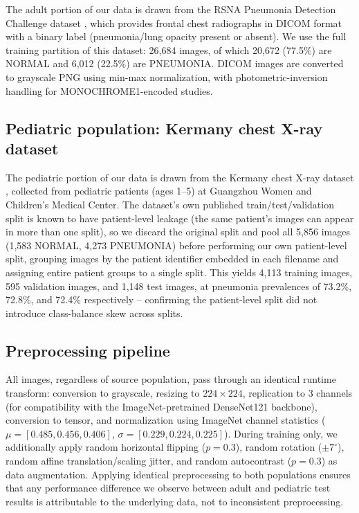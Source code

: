 \documentclass[conference]{IEEEtran}
\begin{document}
The adult portion of our data is drawn from the RSNA Pneumonia Detection
Challenge dataset \cite{rsna2019}, which provides frontal chest radiographs
in DICOM format with a binary label (pneumonia/lung opacity present or
absent). We use the full training partition of this dataset: 26{,}684
images, of which 20{,}672 (77.5\%) are NORMAL and 6{,}012 (22.5\%) are
PNEUMONIA. DICOM images are converted to grayscale PNG using min-max
normalization, with photometric-inversion handling for MONOCHROME1-encoded
studies.

\subsection{Pediatric population: Kermany chest X-ray dataset}

The pediatric portion of our data is drawn from the Kermany chest X-ray
dataset \cite{kermany2018cell}, collected from pediatric patients (ages 1--5)
at Guangzhou Women and Children's Medical Center. The dataset's own
published train/test/validation split is known to have patient-level
leakage (the same patient's images can appear in more than one split), so we
discard the original split and pool all 5{,}856 images (1{,}583 NORMAL,
4{,}273 PNEUMONIA) before performing our own patient-level split, grouping
images by the patient identifier embedded in each filename and assigning
entire patient groups to a single split. This yields 4{,}113 training
images, 595 validation images, and 1{,}148 test images, at pneumonia
prevalences of 73.2\%, 72.8\%, and 72.4\% respectively -- confirming the
patient-level split did not introduce class-balance skew across splits.

\subsection{Preprocessing pipeline}

All images, regardless of source population, pass through an identical
runtime transform: conversion to grayscale, resizing to $224\times224$,
replication to 3 channels (for compatibility with the ImageNet-pretrained
DenseNet121 backbone), conversion to tensor, and normalization using
ImageNet channel statistics ($\mu = [0.485, 0.456, 0.406]$,
$\sigma = [0.229, 0.224, 0.225]$). During training only, we additionally
apply random horizontal flipping ($p=0.3$), random rotation ($\pm7^\circ$),
random affine translation/scaling jitter, and random autocontrast
($p=0.3$) as data augmentation. Applying identical preprocessing to both
populations ensures that any performance difference we observe between
adult and pediatric test results is attributable to the underlying data,
not to inconsistent preprocessing.
\end{document}
